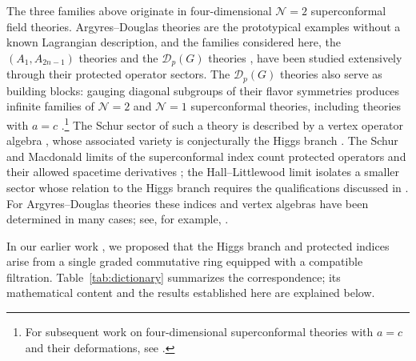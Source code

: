 \documentclass[10pt,reqno]{amsart}
\numberwithin{equation}{section}
\theoremstyle{plain}
\theoremstyle{definition}
\begin{document}
The three families above originate in four-dimensional $\mathcal N=2$ superconformal field theories. Argyres--Douglas theories \cite{Argyres:1995jj,Argyres:1995xn} are the prototypical examples without a known Lagrangian description, and the families considered here, the $(A_1,A_{2n-1})$ theories \cite{Cecotti:2010fi,Xie:2012hs} and the $\mathcal{D}_p(G)$ theories \cite{Cecotti:2012jx,Cecotti:2013lda}, have been studied extensively through their protected operator sectors. The $\mathcal{D}_p(G)$ theories also serve as building blocks: gauging diagonal subgroups of their flavor symmetries produces infinite families of $\mathcal N=2$ and $\mathcal N=1$ superconformal theories, including theories with $a=c$ \cite{Kang:2021lic,Kang:2021ccs}.\footnote{For subsequent work on four-dimensional superconformal theories with $a=c$ and their deformations, see \cite{Kang:2022vab,Kang:2023dsa,Kang:2024elv,Kang:2024inx}.} The Schur sector of such a theory is described by a vertex operator algebra \cite{Beem:2013sza}, whose associated variety is conjecturally the Higgs branch \cite{Beem:2017ooy,Kang:2022zsl}. The Schur and Macdonald limits of the superconformal index count protected operators and their allowed spacetime derivatives \cite{Kinney:2005ej,Gadde:2011uv}; the Hall--Littlewood limit isolates a smaller sector whose relation to the Higgs branch requires the qualifications discussed in \cite{Kang:2022zsl}. For Argyres--Douglas theories these indices and vertex algebras have been determined in many cases; see, for example, \cite{Buican:2015ina,Creutzig:2017qyf,Song:2017oew,Song:2016yfd,Kang:2026nge,Kang:2022zsl}.

In our earlier work \cite{Kang:2025zub,Kang:2026nge,KLSnonpoint}, we proposed that the Higgs branch and protected indices arise from a single graded commutative ring equipped with a compatible filtration. Table~\ref{tab:dictionary} summarizes the correspondence; its mathematical content and the results established here are explained below.
\end{document}
